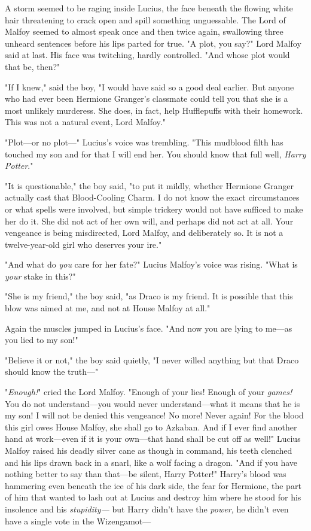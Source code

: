 A storm seemed to be raging inside Lucius, the face beneath the flowing white 
hair threatening to crack open and spill something unguessable. The Lord of 
Malfoy seemed to almost speak once and then twice again, swallowing three 
unheard sentences before his lips parted for true. "A plot, you say?" Lord 
Malfoy said at last. His face was twitching, hardly controlled. "And whose plot 
would that be, then?"

"If I knew," said the boy, "I would have said so a good deal earlier. But 
anyone who had ever been Hermione Granger's classmate could tell you that she 
is a most unlikely murderess. She does, in fact, help Hufflepuffs with their 
homework. This was not a natural event, Lord Malfoy."

"Plot---or no plot---" Lucius's voice was trembling. "This mudblood filth has 
touched my son and for that I will end her. You should know that full well, 
\emph{Harry Potter}."

"It is questionable," the boy said, "to put it mildly, whether Hermione Granger 
actually cast that Blood-Cooling Charm. I do not know the exact circumstances 
or what spells were involved, but simple trickery would not have sufficed to 
make her do it. She did not act of her own will, and perhaps did not act at 
all. Your vengeance is being misdirected, Lord Malfoy, and deliberately so. It 
is not a twelve-year-old girl who deserves your ire."

"And what do \emph{you} care for her fate?" Lucius Malfoy's voice was rising. 
"What is \emph{your} stake in this?"

"She is my friend," the boy said, "as Draco is my friend. It is possible that 
this blow was aimed at me, and not at House Malfoy at all."

Again the muscles jumped in Lucius's face. "And now you are lying to me---as 
you lied to my son!"

"Believe it or not," the boy said quietly, "I never willed anything but that 
Draco should know the truth---"

"\emph{Enough!}" cried the Lord Malfoy. "Enough of your lies! Enough of your 
\emph{games!} You do not understand---you would never understand---what it 
means that he is my son! I will not be denied this vengeance! No more! Never 
again! For the blood this girl owes House Malfoy, she shall go to Azkaban. And 
if I ever find another hand at work---even if it is your own---that hand shall 
be cut off as well!" Lucius Malfoy raised his deadly silver cane as though in 
command, his teeth clenched and his lips drawn back in a snarl, like a wolf 
facing a dragon. "And if you have nothing better to say than that---be silent, 
Harry Potter!"
\sbreak
Harry's blood was hammering even beneath the ice of his dark side, the fear for 
Hermione, the part of him that wanted to lash out at Lucius and destroy him 
where he stood for his insolence and his \emph{stupidity---} but Harry didn't 
have the \emph{power,} he didn't even have a single vote in the Wizengamot---

